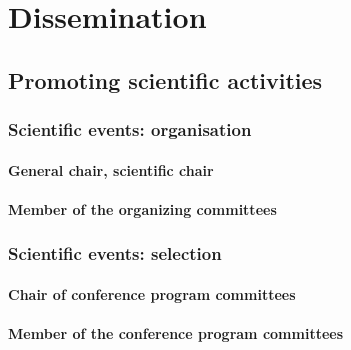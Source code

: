 

\section{Dissemination}
\label{DIVERSE:dissemination}

\subsection{Promoting scientific activities}
\label{DIVERSE:animation}

\subsubsection{Scientific events: organisation}
\label{DIVERSE:animation-eventorga}

\paragraph{General chair, scientific chair}
\label{DIVERSE:animation-eventorga-chair}

\paragraph{Member of the organizing committees}
\label{DIVERSE:animation-eventorga-comittee}

\subsubsection{Scientific events: selection}
\label{DIVERSE:animation-eventselect}

\paragraph{Chair of conference program committees}
\label{DIVERSE:animation-eventselect-chair}

\paragraph{Member of the conference program committees}
\label{DIVERSE:animation-eventselect-member}

